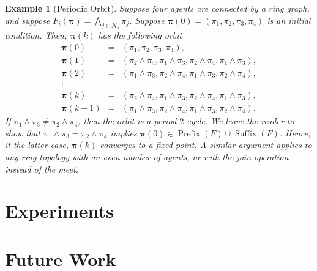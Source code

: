 \documentclass[conference]{ieeeconf}
\newcommand{\N}{\mathcal{N}}
\newcommand{\profile}{\boldsymbol{\pi}}
\newcommand{\meet}{\wedge}
\newcommand{\bigmeet}{\bigwedge}
\DeclareMathOperator{\Pre}{Prefix}
\DeclareMathOperator{\Post}{Suffix}
\newtheorem{example}{Example}
\begin{document}
\begin{example}[Periodic Orbit]
    Suppose four agents are connected by a ring graph, and suppose $F_i(\profile) = \bigmeet_{j \in \N_i} \pi_j$. Suppose $\profile(0) = (\pi_1,\pi_2,\pi_3,\pi_4)$ is an initial condition. Then, $\profile(k)$ has the following orbit
    \begin{align*}
        \profile(0) &=& \left( \pi_1,\pi_2,\pi_3,\pi_4 \right), \\
        \profile(1) &=& \left( \pi_2 \meet \pi_4, \pi_1 \meet \pi_3, \pi_2 \meet \pi_4, \pi_1 \meet \pi_3 \right), \\
        \profile(2) &=& \left( \pi_1 \meet \pi_3, \pi_2 \meet \pi_4, \pi_1 \meet \pi_3, \pi_2 \meet \pi_4 \right), \\
        \vdots &&  \\
        \profile(k) &=& \left( \pi_2 \meet \pi_4, \pi_1 \meet \pi_3, \pi_2 \meet \pi_4, \pi_1 \meet \pi_3 \right), \\
        \profile(k+1) &=& \left( \pi_1 \meet \pi_3, \pi_2 \meet \pi_4, \pi_1 \meet \pi_3, \pi_2 \meet \pi_4 \right).
    \end{align*}
    If $\pi_1 \meet \pi_3 \neq \pi_2 \meet \pi_4$, then the orbit is a period-$2$ cycle. We leave the reader to show that $\pi_1 \meet \pi_3 = \pi_2 \meet \pi_4$ implies $\profile(0) \in \Pre(F) \cup \Post(F)$. Hence, it the latter case, $\profile(k)$ converges to a fixed point. A similar argument applies to any ring topology with an even number of agents, or with the join operation instead of the meet.
\end{example}


\section{Experiments}
\label{sec:experiments}


\section{Future Work}
\label{sec:future-work}
\end{document}
